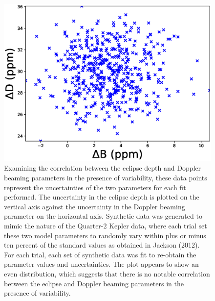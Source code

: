 \documentclass[manuscript]{aastex}
\begin{document}
\begin{figure}

\includegraphics[width=1.0\textwidth]{synthetic_correlation_beaming_vary.eps}
\caption{Examining the correlation between the eclipse depth and Doppler beaming parameters in the presence of variability, these data points represent the uncertainties of the two parameters for each fit performed. The uncertainty in the eclipse depth is plotted on the vertical axis against the uncertainty in the Doppler beaming parameter on the horizontal axis. Synthetic data was generated to mimic the nature of the Quarter-2 Kepler data, where each trial set these two model parameters to randomly vary within plus or minus ten percent of the standard values as obtained in Jackson (2012). For each trial, each set of synthetic data was fit to re-obtain the parameter values and uncertainties. The plot appears to show an even distribution, which suggests that there is no notable correlation between the eclipse and Doppler beaming parameters in the presence of variability.}

\end{figure}
\end{document}
